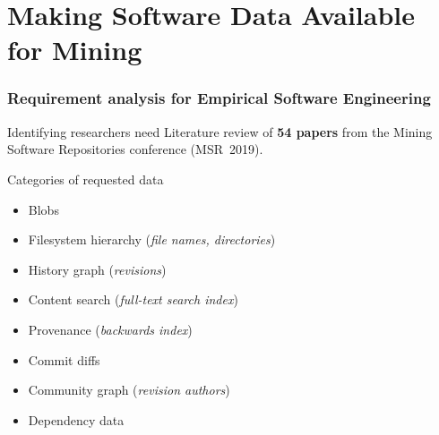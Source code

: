 \documentclass[aspectratio=169,xcolor=table]{beamer}
\begin{document}


    \section{Making Software Data Available for Mining}

    \begin{frame}
        \frametitle{Requirement analysis for Empirical Software Engineering}

        \begin{block}{Identifying researchers need}
            Literature review of \textbf{54 papers} from the Mining Software
            Repositories conference (MSR~2019).
        \end{block}

        \begin{block}{Categories of requested data}
            \begin{itemize}
                \item Blobs
                \item Filesystem hierarchy (\emph{file names, directories})
                \item History graph (\emph{revisions})
                \item Content search (\emph{full-text search index})
                \item Provenance (\emph{backwards index})
                \item Commit diffs
                \item Community graph (\emph{revision authors})
                \item Dependency data
            \end{itemize}
        \end{block}
    \end{frame}
\end{document}
